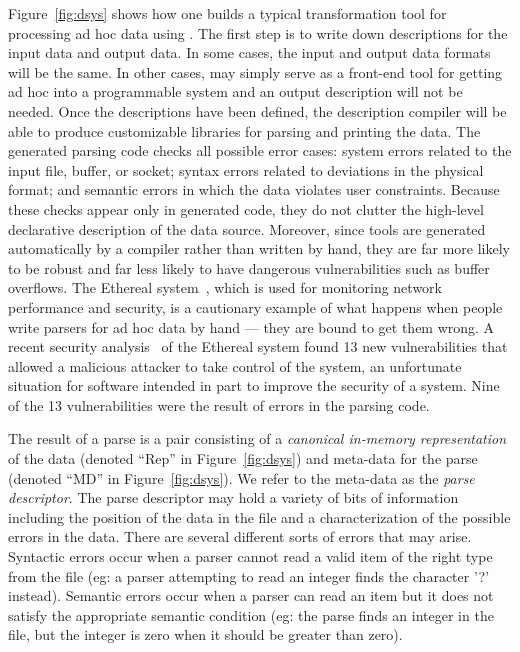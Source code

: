 \documentclass[11pt]{article}
\begin{document}
Figure~\ref{fig:dsys} shows how one builds a typical transformation
tool for processing ad hoc data using \datatype{}.  The first step is
to write down \datatype{} descriptions for the input data and output
data.  In some cases, the input
and output data formats will be the same.  In other cases, \datatype{}
may simply serve as a front-end tool for getting ad hoc into a
programmable system and an output description will not be needed.
Once the descriptions have been defined, the \datatype{} description
compiler will be able to produce customizable libraries for parsing
and printing the data.  The generated parsing code checks all possible
error cases: system errors related to the input file, buffer, or
socket; syntax errors related to deviations in the physical format;
and semantic errors in which the data violates user constraints.
Because these checks appear only in generated code, they do not
clutter the high-level declarative description of the data source.
Moreover, since tools are generated automatically by a compiler rather
than written by hand, they are far more likely to be robust and far
less likely to have dangerous vulnerabilities such as buffer
overflows.  The Ethereal system~\cite{ethereal}, which is used for
monitoring network performance and security, is a cautionary example
of what happens when people write parsers for ad hoc data by hand ---
they are bound to get them wrong.  A recent security analysis~\cite{etherealvulnerabilities} of the
Ethereal system found 13 new vulnerabilities
that allowed a malicious attacker to take control of the system, an
unfortunate situation for software intended in part to improve the
security of a system. Nine of the 13 vulnerabilities
were the result of errors in the
parsing code.


The result of a parse is a pair consisting of a {\em canonical
in-memory representation} of the data (denoted ``Rep'' in 
Figure~\ref{fig:dsys}) and meta-data for the parse 
(denoted ``MD'' in 
Figure~\ref{fig:dsys}).  We
refer to the meta-data as the {\em parse descriptor}. The parse
descriptor may hold a variety of bits of information including
the position of the data in the file and a characterization
of the possible errors in the data.  There are several
different sorts of errors that may arise.  Syntactic errors occur
when a parser cannot read a valid item of the right type from the file 
(eg: a parser attempting to read an integer finds the character '?'
instead).  Semantic errors occur when a parser can read an item
but it does not satisfy the appropriate semantic condition (eg: the
parse finds an integer in the file, but the integer is zero when it
should be greater than zero).  
\end{document}

